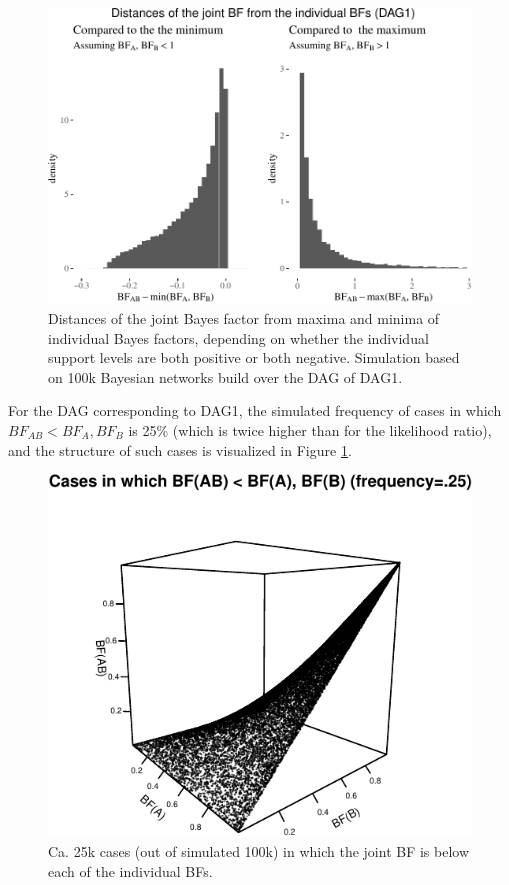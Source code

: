 \documentclass[
  10pt,
  dvipsnames,enabledeprecatedfontcommands]{scrartcl}
\begin{document}
\begin{figure}[ht]

\begin{center}\includegraphics[width=1\linewidth]{conjunction-appendix5_files/figure-latex/BFind-1} \end{center}
\caption{Distances of the joint Bayes factor from maxima and minima of individual Bayes factors, depending on whether the individual support levels are both positive or both negative. Simulation based on 100k Bayesian networks build over the DAG of \textsf{DAG1}.}
\end{figure}

For the DAG corresponding to \textsf{DAG1}, the simulated frequency of
cases in which \(BF_{AB} < BF_{A}, BF_{B}\) is 25\% (which is twice
higher than for the likelihood ratio), and the structure of such cases
is visualized in Figure \ref{fig:BFfails}.

\begin{figure}

\begin{center}\includegraphics[width=1\linewidth]{conjunction-appendix5_files/figure-latex/unnamed-chunk-7-1} \end{center}
\caption{Ca. 25k cases (out of simulated 100k) in which the joint BF is below each of the individual BFs.}
\label{fig:BFfails}
\end{figure}
\end{document}
